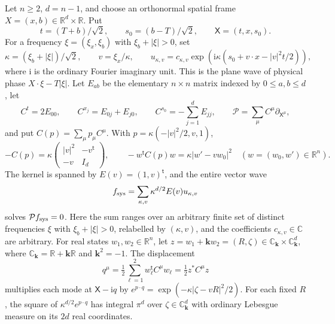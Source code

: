 Let $n\ge2$, $d=n-1$, and choose an orthonormal spatial frame $X=(x,b)\in\mathbb R^d\times\mathbb R$. Put
\[
t=(T+b)/\sqrt2,\qquad s_0=(b-T)/\sqrt2,\qquad \mathsf X=(t,x,s_0).
\]
For a frequency $\xi=(\xi_x,\xi_b)$ with $\xi_b+|\xi|>0$, set
\[
\kappa=(\xi_b+|\xi|)/\sqrt2,\qquad v=\xi_x/\kappa,\qquad
u_{\kappa,v}=c_{\kappa,v}\exp\!\left(\mathrm i\kappa(s_0+v\cdot x-|v|^2t/2)\right),
\]
where $\mathrm i$ is the ordinary Fourier imaginary unit. This is the plane wave of physical phase $X\cdot\xi-T|\xi|$. Let $E_{ab}$ be the elementary $n\times n$ matrix indexed by $0\le a,b\le d$, let
\[
C^t=2E_{00},\qquad C^{x_j}=E_{0j}+E_{j0},\qquad C^{s_0}=-\sum_{j=1}^d E_{jj},
\qquad \mathcal P=\sum_\mu C^\mu\partial_{\mathsf X^\mu},
\]
and put $C(p)=\sum_\mu p_\mu C^\mu$. With $p=\kappa(-|v|^2/2,v,1)$,
\[
-C(p)=\kappa
\begin{pmatrix}|v|^2&-v^{\mathsf t}\\-v&I_d\end{pmatrix},
\qquad -w^{\mathsf t}C(p)w=\kappa|w'-vw_0|^2\quad(w=(w_0,w')\in\mathbb R^n).
\]
The kernel is spanned by $E(v)=(1,v)^{\mathsf t}$, and the entire vector wave
\[
f_{\rm sys}=\sum_{\kappa,v}\kappa^{d/2}E(v)u_{\kappa,v}
\]
solves $\mathcal P f_{\rm sys}=0$. Here the sum ranges over an arbitrary finite set of distinct frequencies $\xi$ with $\xi_b+|\xi|>0$, relabelled by $(\kappa,v)$, and the coefficients $c_{\kappa,v}\in\mathbb C$ are arbitrary. For real states $w_1,w_2\in\mathbb R^n$, let $z=w_1+\mathbf k w_2=(R,\zeta)\in\mathbb C_{\mathbf k}\times\mathbb C_{\mathbf k}^d$, where $\mathbb C_{\mathbf k}=\mathbb R+\mathbf k\mathbb R$ and $\mathbf k^2=-1$. The displacement
\[
q^\mu=\tfrac12\sum_{\ell=1}^2w_\ell^{\mathsf t}C^\mu w_\ell=\tfrac12z^*C^\mu z
\]
multiplies each mode at $\mathsf X-\mathrm i q$ by $e^{p\cdot q}=\exp(-\kappa|\zeta-vR|^2/2)$. For each fixed $R$, the square of $\kappa^{d/2}e^{p\cdot q}$ has integral $\pi^d$ over $\zeta\in\mathbb C_{\mathbf k}^d$ with ordinary Lebesgue measure on its $2d$ real coordinates.
